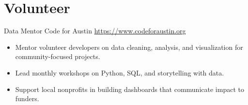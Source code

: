 \documentclass[a4paper, serif, 10pt]{moderncv}
\begin{document}
\section{Volunteer}

        {Data Mentor}
        {Code for Austin}
        {\url{https://www.codeforaustin.org}}
        {}
        {\begin{itemize}
\item Mentor volunteer developers on data cleaning, analysis, and visualization for community-focused projects.
\item Lead monthly workshops on Python, SQL, and storytelling with data.
\item Support local nonprofits in building dashboards that communicate impact to funders.
\end{itemize}}
\end{document}
